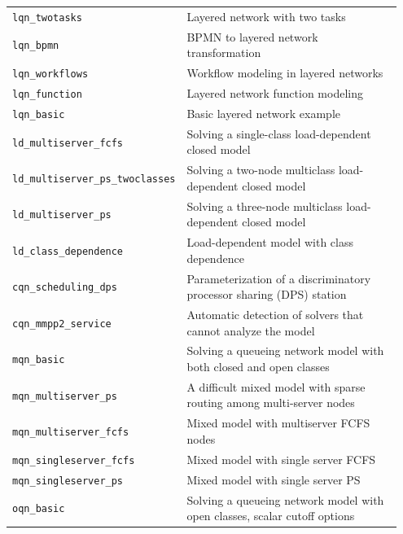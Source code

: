 \begin{footnotesize}
\begin{longtable}{|p{0.35\linewidth}|p{0.60\linewidth}|}
\texttt{lqn\_twotasks} & Layered network with two tasks\\
\texttt{lqn\_bpmn} & BPMN to layered network transformation\\
\texttt{lqn\_workflows} & Workflow modeling in layered networks\\
\texttt{lqn\_function} & Layered network function modeling\\
\texttt{lqn\_basic} & Basic layered network example\\
\hline
\texttt{ld\_multiserver\_fcfs} &  Solving a single-class load-dependent closed model\\
\texttt{ld\_multiserver\_ps\_twoclasses} &  Solving a two-node multiclass load-dependent closed model\\
\texttt{ld\_multiserver\_ps} &  Solving a three-node multiclass load-dependent closed model\\
\texttt{ld\_class\_dependence} &  Load-dependent model with class dependence\\
\hline
\texttt{cqn\_scheduling\_dps} &  Parameterization of a discriminatory processor sharing (DPS) station\\
\texttt{cqn\_mmpp2\_service} &  Automatic detection of solvers that cannot analyze the model\\
\hline
\texttt{mqn\_basic} & Solving a queueing network model with both closed and open classes \\
\texttt{mqn\_multiserver\_ps} & A difficult mixed model with sparse routing among multi-server nodes \\
\texttt{mqn\_multiserver\_fcfs} & Mixed model with multiserver FCFS nodes\\
\texttt{mqn\_singleserver\_fcfs} & Mixed model with single server FCFS\\
\texttt{mqn\_singleserver\_ps} & Mixed model with single server PS\\
\hline
\texttt{oqn\_basic} & Solving a queueing network model with open classes, scalar cutoff options \\

\end{longtable}
\end{footnotesize}
